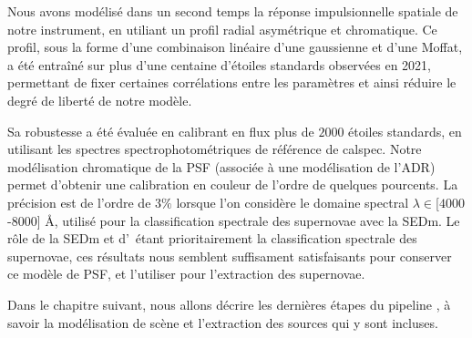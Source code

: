 \documentclass[../main/main.tex]{subfiles}
\begin{document}
Nous avons modélisé dans un second temps la réponse impulsionnelle
spatiale de notre instrument, en utiliant un profil radial asymétrique et chromatique. Ce
profil, sous la forme d'une combinaison linéaire d'une gaussienne et
d'une Moffat, a été entraîné sur plus d'une centaine d'étoiles standards observées en 2021,
permettant de fixer certaines corrélations entre les paramètres et ainsi
réduire le degré de liberté de notre modèle.

Sa robustesse a été évaluée en calibrant en flux plus de $2000$ étoiles
standards, en utilisant les spectres spectrophotométriques de référence
de calspec. Notre modélisation chromatique de la PSF (associée à une
modélisation de l'ADR) permet d'obtenir une
calibration en couleur de l'ordre de quelques pourcents. La précision
est de l'ordre de $3\%$
lorsque l'on considère le domaine spectral $\lambda\in$[$4000$-$8000$]
\AA, utilisé pour la classification spectrale des supernovae avec la SEDm.
Le rôle de la SEDm et d'\hypergal\ étant prioritairement la classification spectrale des
supernovae, ces résultats nous semblent suffisament satisfaisants pour
conserver ce modèle de PSF, et l'utiliser pour l'extraction
des supernovae.

Dans le chapitre suivant, nous allons décrire les dernières étapes du
pipeline \hypergal, à savoir la modélisation de scène et l'extraction
des sources qui y sont incluses.


\end{document}
